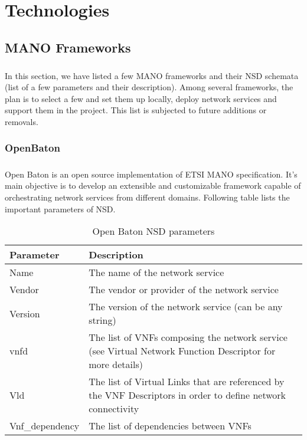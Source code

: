 \chapter{Technologies}
\label{ch:Technologies}
\section{MANO Frameworks}
\paragraph{}
In this section, we have listed a few MANO frameworks and their NSD schemata (list of a few parameters and their description). Among several frameworks, the plan is to select a few and set them up locally, deploy network services and support them in the project. This list is subjected to future additions or removals.
\subsection{OpenBaton}
\paragraph{}
Open Baton is an open source implementation of ETSI MANO specification. It's main objective is to develop an extensible and customizable framework capable of orchestrating network services from different domains\cite{openBaton}. Following table lists the important parameters of NSD\cite{openBatonSchemaDocumentation}. 
    \begin{table}[h]
        \centering
        \begin{tabular}{ |p{4cm}|p{10cm}|}
            \hline
            \textbf{Parameter} & \textbf{Description} \\
            \hline
             
             Name & The name of the network service \\
             \hline
             Vendor & The vendor or provider of the network service \\
             \hline
             Version & The version of the network service (can be any string) \\
             \hline
             vnfd & The list of VNFs composing the network service (see Virtual Network Function Descriptor for more details) \\
             \hline
             Vld & The list of Virtual Links that are referenced by the VNF Descriptors in order to define network connectivity \\
             \hline
             Vnf\_dependency & The list of dependencies between VNFs\\
             \hline
        \end{tabular}
        \caption{Open Baton NSD parameters}
        \label{tab:OpenBatonSchema}
    \end{table}
